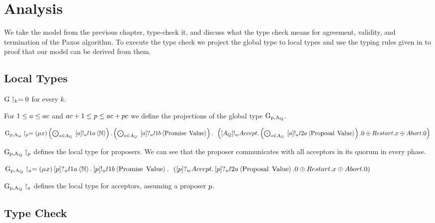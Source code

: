 \chapter{Analysis}
We take the model from the previous chapter, type-check it, and discuss what the type check means for agreement, validity, and termination of the Paxos algorithm.
To execute the type check we project the global type to local types and use the typing rules given in \cite{ftmpst} to proof that our model can be derived from them.

\section{Local Types}
$\operatorname{G} \upharpoonright_{k} = 0$ for every $k$.


For $1 \leq a \leq ac$ and $ac + 1 \leq p \leq ac + pc$ we define the projections of the global type $\operatorname{G_{p, A_Q}}$.

$\operatorname{G_{p, A_Q}} \upharpoonright_{p} = \left(\mu x\right)
\left(\bigodot_{a\in A_Q}\;\left[a\right]!_u l1a \left\langle \mathbb{N} \right\rangle\right) .
\left(\bigodot_{a\in A_Q}\;\left[a\right]?_u l1b \left\langle \operatorname{Promise}\; \operatorname{Value} \right\rangle\right) .\\
\hspace*{0.5em * 1}\left(\left[A_Q\right]!_w \mathnormal{Accept} . \left(\bigodot_{a\in A_Q}\;\left[a\right]!_u l2a \left\langle \operatorname{Proposal}\; \operatorname{Value} \right\rangle\right).0 \oplus \mathnormal{Restart} . x \oplus \mathnormal{Abort} .0\right)$

$\operatorname{G_{p, A_Q}} \upharpoonright_{p}$ defines the local type for proposers.
We can see that the proposer communicates with all acceptors in its quorum in every phase.

$\operatorname{G_{p, A_Q}} \upharpoonright_{a} = \left(\mu x\right)
\left[p\right]?_u l1a \left\langle \mathbb{N} \right\rangle .
\left[p\right]!_u l1b \left\langle \operatorname{Promise}\; \operatorname{Value} \right\rangle .\\
\hspace*{0.5em * 1}\left(\left[p\right]?_w \mathnormal{Accept} . \left[p\right]?_u l2a \left\langle \operatorname{Proposal}\; \operatorname{Value} \right\rangle.0 \oplus \mathnormal{Restart} . x \oplus \mathnormal{Abort} .0\right)$

$\operatorname{G_{p, A_Q}} \upharpoonright_{a}$ defines the local type for acceptors, assuming a proposer $p$.


\section{Type Check}
